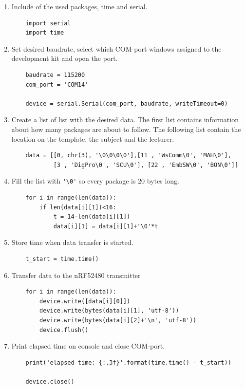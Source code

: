 \begin{enumerate}
	\item Include of the used packages, time and serial.
	\begin{lstlisting}
	import serial
	import time
	\end{lstlisting}	
	\item Set desired baudrate, select which COM-port windows assigned to the development kit and open the port.
	\begin{lstlisting}
	baudrate = 115200
	com_port = 'COM14'
	
	device = serial.Serial(com_port, baudrate, writeTimeout=0)
	\end{lstlisting}
	\item Create a list of list with the desired data.
	The first list contains information about how many packages are about to follow.
	The following list contain the location on the template, the subject and the lecturer.
	\begin{lstlisting}
	data = [[0, chr(3), '\0\0\0\0'],[11 , 'WsComm\0', 'MAH\0'],
			[3 , 'DigPro\0', 'SCU\0'], [22 , 'EmbSW\0', 'BON\0']]
	\end{lstlisting}
	\item Fill the list with \lstinline|'\0'| so every package is 20 bytes long.
	\begin{lstlisting}
	for i in range(len(data)):
		if len(data[i][1])<16:
			t = 14-len(data[i][1])
			data[i][1] = data[i][1]+'\0'*t
	\end{lstlisting}
	\item Store time when data transfer is started.
	\begin{lstlisting}
	t_start = time.time()
	\end{lstlisting}
	\item Transfer data to the nRF52480 transmitter
	\begin{lstlisting}
	for i in range(len(data)):
		device.write([data[i][0]]) 
		device.write(bytes(data[i][1], 'utf-8'))       
		device.write(bytes(data[i][2]+'\n', 'utf-8'))
		device.flush()
	\end{lstlisting}	
	\item Print elapsed time on console and close COM-port.
	\begin{lstlisting}
	print('elapsed time: {:.3f}'.format(time.time() - t_start))
	
	device.close()
	\end{lstlisting}
	
\end{enumerate}